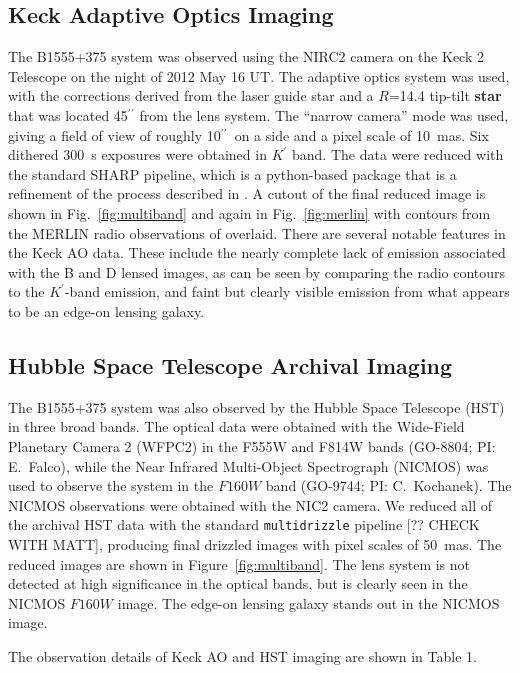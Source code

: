 \documentclass[useAMS,usenatbib]{mn2e}
\begin{document}
\subsection{Keck Adaptive Optics Imaging}

The B1555+375 system was observed using the NIRC2 camera on the Keck 2
Telescope on the night of 2012 May 16 UT.  The adaptive optics system
was used, with the corrections derived from the laser guide star and a
$R$=14.4 tip-tilt \textbf{star} that was located 45$^{\prime\prime}$ from the lens
system.  The ``narrow camera'' mode was used, giving a field of view
of roughly 10$^{\prime\prime}$\ on a side and a pixel scale of 10~mas.
Six dithered 300~s exposures were obtained in $K^{\prime}$ band.  The
data were reduced with the standard SHARP pipeline, which is a
python-based package that is a refinement of the process described in
\citet{Auger_EELS1}.  A cutout of the final reduced image is shown in
Fig.~\ref{fig:multiband} and again in Fig.~\ref{fig:merlin} with
contours from the MERLIN radio observations of \citet{Marlow99}
overlaid.  There are several notable features in the Keck AO data.
These include the nearly complete lack of emission associated with the
B and D lensed images, as can be seen by comparing the radio contours
to the $K^\prime$-band emission, and faint but clearly visible
emission from what appears to be an edge-on lensing galaxy.

\subsection{Hubble Space Telescope Archival Imaging}

The B1555+375 system was also observed by the Hubble Space Telescope
(HST) in three broad bands.  The optical data were obtained with the
Wide-Field Planetary Camera 2 (WFPC2) in the F555W and F814W bands
(GO-8804; PI: E.\ Falco), while the Near Infrared Multi-Object
Spectrograph (NICMOS) was used to observe the system in the $F160W$
band (GO-9744; PI: C.\ Kochanek).  The NICMOS observations were
obtained with the NIC2 camera.  We reduced all of the archival HST
data with the standard {\tt multidrizzle} pipeline [?? CHECK WITH
  MATT], producing final drizzled images with pixel scales of 50~mas.
The reduced images are shown in Figure~\ref{fig:multiband}.  The lens
system is not detected at high significance in the optical bands, but
is clearly seen in the NICMOS $F160W$ image.  The edge-on lensing
galaxy stands out in the NICMOS image.

The observation details of Keck AO and HST imaging are shown in Table 1.
\end{document}
